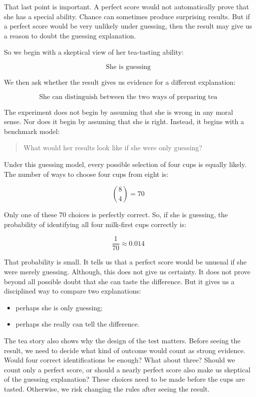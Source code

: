 \documentclass[
  letterpaper,
  DIV=11,
  numbers=noendperiod]{scrreprt}
\providecommand{\tightlist}{%
  \setlength{\itemsep}{0pt}\setlength{\parskip}{0pt}}
\begin{document}
That last point is important. A perfect score would not automatically
prove that she has a special ability. Chance can sometimes produce
surprising results. But if a perfect score would be very unlikely under
guessing, then the result may give us a reason to doubt the guessing
explanation.

So we begin with a skeptical view of her tea-tasting ability:

\[
\text{She is guessing}
\]

We then ask whether the result gives us evidence for a different
explanation:

\[
\text{She can distinguish between the two ways of preparing tea}
\]

The experiment does not begin by assuming that she is wrong in any moral
sense. Nor does it begin by assuming that she is right. Instead, it
begins with a benchmark model:

\begin{quote}
What would her results look like if she were only guessing?
\end{quote}

Under this guessing model, every possible selection of four cups is
equally likely. The number of ways to choose four cups from eight is:

\[
\binom{8}{4} = 70
\]

Only one of these 70 choices is perfectly correct. So, if she is
guessing, the probability of identifying all four milk-first cups
correctly is:

\[
\frac{1}{70} \approx 0.014
\]

That probability is small. It tells us that a perfect score would be
unusual if she were merely guessing. Although, this does not give us
certainty. It does not prove beyond all possible doubt that she can
taste the difference. But it gives us a disciplined way to compare two
explanations:

\begin{itemize}
\tightlist
\item
  perhaps she is only guessing;
\item
  perhaps she really can tell the difference.
\end{itemize}

The tea story also shows why the design of the test matters. Before
seeing the result, we need to decide what kind of outcome would count as
strong evidence. Would four correct identifications be enough? What
about three? Should we count only a perfect score, or should a nearly
perfect score also make us skeptical of the guessing explanation? These
choices need to be made before the cups are tasted. Otherwise, we risk
changing the rules after seeing the result.
\end{document}
